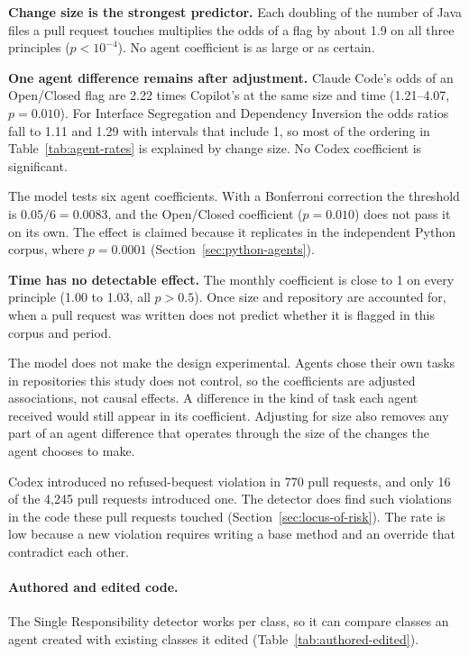 \textbf{Change size is the strongest predictor.} Each doubling of the number of Java files a pull
request touches multiplies the odds of a flag by about 1.9 on all three principles ($p < 10^{-4}$).
No agent coefficient is as large or as certain.

\textbf{One agent difference remains after adjustment.} Claude Code's odds of an Open/Closed flag are
2.22 times Copilot's at the same size and time (1.21--4.07, $p = 0.010$). For Interface Segregation
and Dependency Inversion the odds ratios fall to 1.11 and 1.29 with intervals that include 1, so most
of the ordering in Table~\ref{tab:agent-rates} is explained by change size. No Codex coefficient is
significant.

The model tests six agent coefficients. With a Bonferroni correction the threshold is
$0.05/6 = 0.0083$, and the Open/Closed coefficient ($p = 0.010$) does not pass it on its own. The
effect is claimed because it replicates in the independent Python corpus, where $p = 0.0001$
(Section~\ref{sec:python-agents}).

\textbf{Time has no detectable effect.} The monthly coefficient is close to 1 on every principle
(1.00 to 1.03, all $p > 0.5$). Once size and repository are accounted for, when a pull request was
written does not predict whether it is flagged in this corpus and period.

The model does not make the design experimental. Agents chose their own tasks in repositories this
study does not control, so the coefficients are adjusted associations, not causal effects. A
difference in the kind of task each agent received would still appear in its coefficient. Adjusting
for size also removes any part of an agent difference that operates through the size of the changes
the agent chooses to make.

Codex introduced no refused-bequest violation in 770 pull requests, and only 16 of the 4{,}245 pull
requests introduced one. The detector does find such violations in the code these pull requests
touched (Section~\ref{sec:locus-of-risk}). The rate is low because a new violation requires writing a
base method and an override that contradict each other.

\paragraph{Authored and edited code.} The Single Responsibility detector works per class, so it can
compare classes an agent created with existing classes it edited
(Table~\ref{tab:authored-edited}).

